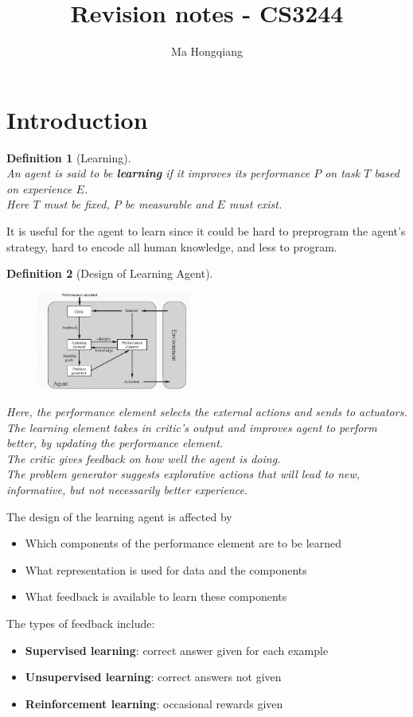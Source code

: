 \documentclass[12pt]{article}
\newtheorem{definition}{Definition}[section]
\theoremstyle{definition}
\begin{document}
\title{Revision notes - CS3244}
\author{Ma Hongqiang}
\maketitle
\tableofcontents

\clearpage
\twocolumn
\section{Introduction}
\begin{definition}[Learning]
\hfill\\\normalfont
An agent is said to be \textbf{learning} if it improves its performance $P$ on task $T$ based on experience $E$.\\
Here $T$ must be fixed, $P$ be measurable and $E$ must exist.
\end{definition}
It is useful for the agent to learn since it could be hard to preprogram the agent's strategy, hard to encode all human knowledge, and less to program.
\begin{definition}[Design of Learning Agent]
\hfill\\\normalfont \begin{figure}[h]
\centering
\includegraphics[width=0.45\textwidth]{1-1.jpg}
\end{figure}
Here, the performance element selects the external actions and sends to actuators.\\
The learning element takes in critic's output and improves agent to perform better, by updating the performance element.\\
The critic gives feedback on how well the agent is doing.\\
The problem generator suggests explorative actions that will lead to new, informative, but not necessarily better experience.
\end{definition}
The design of the learning agent is affected by
\begin{itemize}
	\item Which components of the performance element are to be learned
	\item What representation is used for data and the components
	\item What feedback is available to learn these components
\end{itemize}
The types of feedback include:
\begin{itemize}
	\item \textbf{Supervised learning}: correct answer given for each example
	\item \textbf{Unsupervised learning}: correct answers not given
	\item \textbf{Reinforcement learning}: occasional rewards given
\end{itemize}
\end{document}
